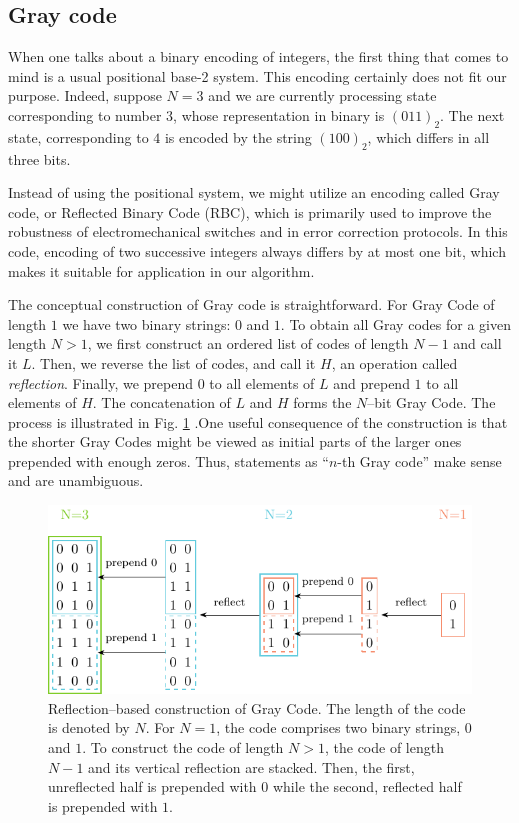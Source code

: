 \subsection{Gray code}
When one talks about a binary encoding of integers, the first thing that comes
to mind is a usual positional base-2 system. This encoding certainly does not
fit our purpose. Indeed, suppose $N=3$ and we are currently processing state
corresponding to number $3$, whose representation in binary is $(011)_{2}$. The
next state, corresponding to $4$ is encoded by the string $(100)_{2}$, which
differs in all three bits.

Instead of using the positional system, we might utilize an encoding called
Gray code, or Reflected Binary Code (RBC), which is primarily used to improve
the robustness of electromechanical switches and in error correction protocols.
In this code, encoding of two successive integers always differs by at most one
bit, which makes it suitable for application in our algorithm.

The conceptual construction of Gray code is straightforward. For Gray Code of
length $1$ we have two binary strings: $0$ and $1$. To obtain all Gray codes
for a given length $N > 1$, we first construct an ordered list of codes of
length $N-1$ and call it $L$. Then, we reverse the list of codes, and call it
$H$, an operation called \emph{reflection}. Finally, we prepend $0$ to all
elements of $L$ and prepend $1$ to all elements of $H$. The concatenation of
$L$ and $H$ forms the $N$--bit Gray Code. The process is illustrated in Fig.
\ref{fig:gray} .One useful consequence of the construction is that the shorter
Gray Codes might be viewed as initial parts of the larger ones prepended with
enough zeros. Thus, statements as ``$n$-th Gray code'' make sense and are
unambiguous.

\begin{figure}
  \includegraphics[width=\textwidth]{figures/gray.pdf}
  \caption{Reflection--based construction of Gray Code. The length of the code is denoted
    by $N$. For $N=1$, the code comprises two binary strings, $0$ and $1$. To
    construct the code of length $N>1$, the code of length $N-1$ and its vertical
    reflection are stacked. Then, the first, unreflected half is prepended with $0$
    while the second, reflected half is prepended with $1$.} \label{fig:gray}
\end{figure}

